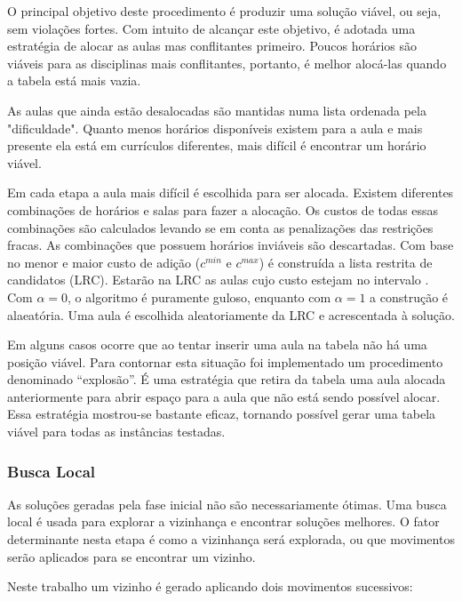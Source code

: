 \documentclass[11pt]{article}
\begin{document}
O principal objetivo deste procedimento é produzir uma solução viável, ou seja, sem violações fortes. Com intuito de alcançar este objetivo, é adotada uma estratégia de alocar as aulas mas conflitantes primeiro. Poucos horários são viáveis para as disciplinas mais conflitantes, portanto, é melhor alocá-las quando a tabela está mais vazia.

As aulas que ainda estão desalocadas são mantidas numa lista ordenada pela "dificuldade". Quanto menos horários disponíveis existem para a aula e mais presente ela está em currículos diferentes, mais difícil é encontrar um horário viável.

Em cada etapa a aula mais difícil é escolhida para ser alocada. Existem diferentes combinações de horários e salas para fazer a alocação. Os custos de todas essas combinações são calculados levando se em conta as penalizações das restrições fracas. As combinações que possuem horários inviáveis são descartadas. Com base no menor e maior custo de adição ($c^{min}$ e $c^{max}$) é construída a lista restrita de candidatos (LRC). Estarão na LRC as aulas cujo custo estejam no intervalo \begin{math} [c^{min}, c^{min}+\alpha(c^{max} - c^{min})]\end{math}. Com $\alpha=0$, o algoritmo é puramente guloso, enquanto com $\alpha=1$ a construção é alaeatória. Uma aula é escolhida aleatoriamente da LRC e acrescentada à solução.

Em alguns casos ocorre que ao tentar inserir uma aula na tabela não há uma posição viável. Para contornar esta situação foi implementado um procedimento denominado “explosão”. É uma estratégia que retira da tabela uma aula alocada anteriormente para abrir espaço para a aula que não está sendo possível alocar. Essa estratégia mostrou-se bastante eficaz, tornando possível gerar uma tabela viável para todas as instâncias testadas.

\subsubsection{Busca Local}

As soluções geradas pela fase inicial não são necessariamente ótimas. Uma busca local é usada para explorar a vizinhança e encontrar soluções melhores. O fator determinante nesta etapa é como a vizinhança será explorada, ou que movimentos serão aplicados para se encontrar um vizinho.

Neste trabalho um vizinho é gerado aplicando dois movimentos sucessivos:
\end{document}
